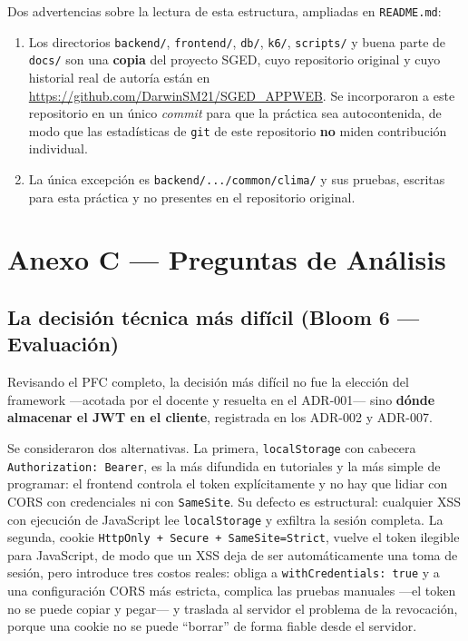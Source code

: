 \documentclass[12pt,a4paper]{article}
\begin{document}
Dos advertencias sobre la lectura de esta estructura, ampliadas en \texttt{README.md}:

\begin{enumerate}
  \item Los directorios \texttt{backend/}, \texttt{frontend/}, \texttt{db/}, \texttt{k6/},
        \texttt{scripts/} y buena parte de \texttt{docs/} son una \textbf{copia} del proyecto
        SGED, cuyo repositorio original y cuyo historial real de autoría están en
        \url{https://github.com/DarwinSM21/SGED_APPWEB}. Se incorporaron a este repositorio en
        un único \textit{commit} para que la práctica sea autocontenida, de modo que las
        estadísticas de \texttt{git} de este repositorio \textbf{no} miden contribución
        individual.
  \item La única excepción es \texttt{backend/.../common/clima/} y sus pruebas, escritas para
        esta práctica y no presentes en el repositorio original.
\end{enumerate}

\section{Anexo C --- Preguntas de Análisis}
\label{apx:anexoC}

\subsection{La decisión técnica más difícil (Bloom 6 --- Evaluación)}

Revisando el PFC completo, la decisión más difícil no fue la elección del framework ---acotada
por el docente y resuelta en el ADR-001--- sino \textbf{dónde almacenar el JWT en el cliente},
registrada en los ADR-002 y ADR-007.

Se consideraron dos alternativas. La primera, \texttt{localStorage} con cabecera
\texttt{Authorization: Bearer}, es la más difundida en tutoriales y la más simple de programar:
el frontend controla el token explícitamente y no hay que lidiar con CORS con credenciales ni
con \texttt{SameSite}. Su defecto es estructural: cualquier XSS con ejecución de JavaScript lee
\texttt{localStorage} y exfiltra la sesión completa. La segunda, cookie
\texttt{HttpOnly + Secure + SameSite=Strict}, vuelve el token ilegible para JavaScript, de modo
que un XSS deja de ser automáticamente una toma de sesión, pero introduce tres costos reales:
obliga a \texttt{withCredentials: true} y a una configuración CORS más estricta, complica las
pruebas manuales ---el token no se puede copiar y pegar--- y traslada al servidor el problema de
la revocación, porque una cookie no se puede ``borrar'' de forma fiable desde el servidor.
\end{document}
